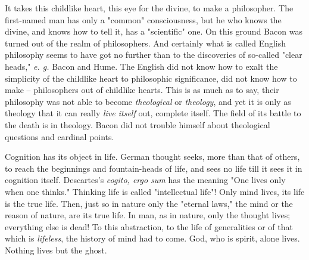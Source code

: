 \noindent{}It takes this childlike heart, this eye for the divine, to make a 
philosopher. The first-named man has only a "{}common"{} consciousness, but he 
who knows the divine, and knows how to tell it, has a "{}scientific"{} one. On 
this ground Bacon was turned out of the realm of philosophers. And certainly 
what is called English philosophy seems to have got no further than to the 
discoveries of so-called "{}clear heads,"{} \textit{e. g.} Bacon and Hume. The 
English did not know how to exalt the simplicity of the childlike heart to 
philosophic significance, did not know how to make -- philosophers out of 
childlike hearts. This is as much as to say, their philosophy was not able to 
become \textit{theological} or \textit{theology}, and yet it is only as 
theology that it can really \textit{live itself} out, complete itself. The 
field of its battle to the death is in theology. Bacon did not trouble himself 
about theological questions and cardinal points.

Cognition has its object in life. German thought seeks, more than that of 
others, to reach the beginnings and fountain-heads of life, and sees no life 
till it sees it in cognition itself. Descartes's \textit{cogito, ergo sum} has 
the meaning "{}One lives only when one thinks."{} Thinking life is called 
"{}intellectual life"{}! Only mind lives, its life is the true life. Then, 
just so in nature only the "{}eternal laws,"{} the mind or the reason of 
nature, are its true life. In man, as in nature, only the thought lives; 
everything else is dead! To this abstraction, to the life of generalities or 
of that which is \textit{lifeless}, the history of mind had to come. God, who 
is spirit, alone lives. Nothing lives but the ghost.


